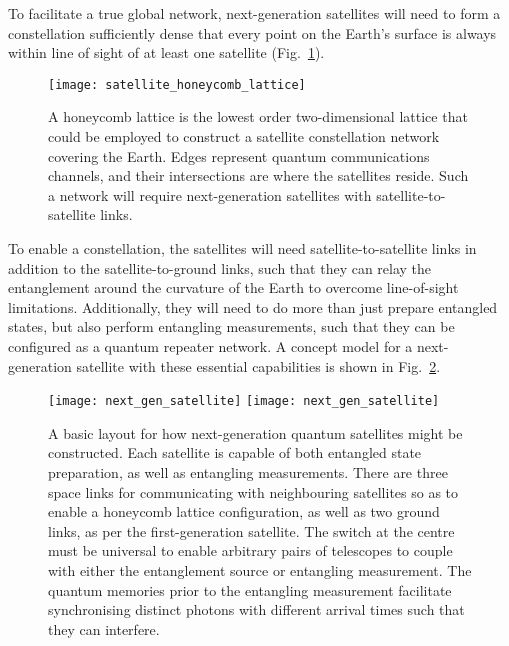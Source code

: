 To facilitate a true global network, next-generation satellites will need to form a constellation sufficiently dense that every point on the Earth's surface is always within line of sight of at least one satellite (Fig.~\ref{fig:sat_honeycomb}).

\begin{figure}[!htbp]
\texttt{[image: satellite\_honeycomb\_lattice]}
\captionspacefig \caption{A honeycomb lattice is the lowest order two-dimensional lattice that could be employed to construct a satellite constellation network covering the Earth. Edges represent quantum communications channels, and their intersections are where the satellites reside. Such a network will require next-generation satellites with satellite-to-satellite links.}\label{fig:sat_honeycomb}	
\end{figure}

To enable a constellation, the satellites will need satellite-to-satellite links in addition to the satellite-to-ground links, such that they can relay the entanglement around the curvature of the Earth to overcome line-of-sight limitations. Additionally, they will need to do more than just prepare entangled states, but also perform entangling measurements, such that they can be configured as a quantum repeater network. A concept model for a next-generation satellite with these essential capabilities is shown in Fig.~\ref{fig:next_gen_sat}.

\begin{figure}[!htbp]
\doublecol
\texttt{[image: next\_gen\_satellite]}
\else
\texttt{[image: next\_gen\_satellite]}
\fi
\captionspacefig \caption{A basic layout for how next-generation quantum satellites might be constructed. Each satellite is capable of both entangled state preparation, as well as entangling measurements. There are three space links for communicating with neighbouring satellites so as to enable a honeycomb lattice configuration, as well as two ground links, as per the first-generation satellite. The switch at the centre must be universal to enable arbitrary pairs of telescopes to couple with either the entanglement source or entangling measurement. The quantum memories prior to the entangling measurement facilitate synchronising distinct photons with different arrival times such that they can interfere.}\label{fig:next_gen_sat}	
\end{figure}

